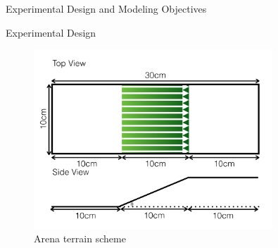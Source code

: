 \begin{subsection}{Experimental Design and Modeling Objectives}

\begin{frame}{Experimental Design}

\begin{figure}
    	\includegraphics[width=0.8\textwidth]{images/model_components_cartoons_011}
      \caption{Arena terrain scheme}
 \end{figure}
\end{frame}


\end{subsection}
